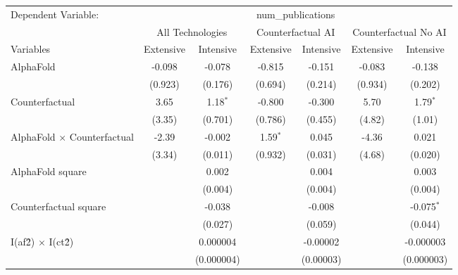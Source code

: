 \begingroup
\centering
\begin{tabular}{lcccccc}
   \tabularnewline \midrule \midrule
   Dependent Variable: & \multicolumn{6}{c}{num\_publications}\\
 & \multicolumn{2}{c}{All Technologies} & \multicolumn{2}{c}{Counterfactual AI} & \multicolumn{2}{c}{Counterfactual No AI} \\
\cmidrule(lr){1-1}\cmidrule(lr){2-3} \cmidrule(lr){4-5} \cmidrule(lr){6-7}
Variables & \multicolumn{1}{c}{Extensive} & \multicolumn{1}{c}{Intensive} & \multicolumn{1}{c}{Extensive} & \multicolumn{1}{c}{Intensive} & \multicolumn{1}{c}{Extensive} & \multicolumn{1}{c}{Intensive} \\
\cmidrule(lr){1-1}\cmidrule(lr){2-2} \cmidrule(lr){3-3} \cmidrule(lr){4-4} \cmidrule(lr){5-5} \cmidrule(lr){6-6} \cmidrule(lr){7-7}
   AlphaFold                          & -0.098  & -0.078     & -0.815     & -0.151    & -0.083  & -0.138\\   
                                      & (0.923) & (0.176)    & (0.694)    & (0.214)   & (0.934) & (0.202)\\   
   Counterfactual                     & 3.65    & 1.18$^{*}$ & -0.800     & -0.300    & 5.70    & 1.79$^{*}$\\   
                                      & (3.35)  & (0.701)    & (0.786)    & (0.455)   & (4.82)  & (1.01)\\   
   AlphaFold $\times$ Counterfactual  & -2.39   & -0.002     & 1.59$^{*}$ & 0.045     & -4.36   & 0.021\\   
                                      & (3.34)  & (0.011)    & (0.932)    & (0.031)   & (4.68)  & (0.020)\\   
   AlphaFold square                   &         & 0.002      &            & 0.004     &         & 0.003\\   
                                      &         & (0.004)    &            & (0.004)   &         & (0.004)\\   
   Counterfactual square              &         & -0.038     &            & -0.008    &         & -0.075$^{*}$\\   
                                      &         & (0.027)    &            & (0.059)   &         & (0.044)\\   
   I(af\^2) $\times$ I(ct\^2)         &         & 0.000004   &            & -0.00002  &         & -0.000003\\   
                                      &         & (0.000004) &            & (0.00003) &         & (0.000003)\\   

\end{tabular}
